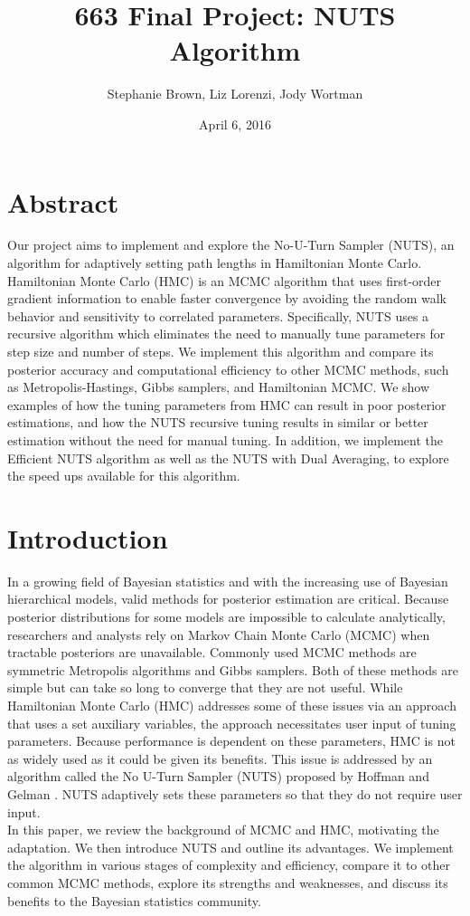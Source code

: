 \documentclass[12pt]{article}
\title{663 Final Project: NUTS Algorithm}
\author{Stephanie Brown, Liz Lorenzi, Jody Wortman}
\date{April 6, 2016}
\begin{document}
\maketitle


\section*{Abstract}
Our project aims to implement and explore the No-U-Turn Sampler (NUTS), an algorithm for adaptively setting path lengths in Hamiltonian Monte Carlo. Hamiltonian Monte Carlo (HMC) is an MCMC algorithm that uses first-order gradient information to enable faster convergence by avoiding the random walk behavior and sensitivity to correlated parameters.  Specifically, NUTS uses a recursive algorithm which eliminates the need to manually tune parameters for step size and number of steps.  We implement this algorithm and compare its posterior accuracy and computational efficiency to other MCMC methods, such as Metropolis-Hastings, Gibbs samplers, and Hamiltonian MCMC. We show examples of how the tuning parameters from HMC can result in poor posterior estimations, and how the NUTS recursive tuning results in similar or better estimation without the need for manual tuning. In addition, we implement the Efficient NUTS algorithm as well as the NUTS with Dual Averaging, to explore the speed ups available for this algorithm.


\section{Introduction}
In a growing field of Bayesian statistics and with the increasing use of Bayesian hierarchical models, valid methods for posterior estimation are critical. Because posterior distributions for some models are impossible to calculate analytically, researchers and analysts rely on Markov Chain Monte Carlo (MCMC) when tractable posteriors are unavailable. Commonly used MCMC methods are symmetric Metropolis algorithms and Gibbs samplers. Both of these methods are simple but can take so long to converge that they are not useful. While Hamiltonian Monte Carlo (HMC) addresses some of these issues via an approach that uses a set auxiliary variables, the approach necessitates user input of tuning parameters. Because performance is dependent on these parameters, HMC is not as widely used as it could be given its benefits. This issue is addressed by an algorithm called the No U-Turn Sampler (NUTS) proposed by Hoffman and Gelman \citeyear{homan2014no}. NUTS adaptively sets these parameters so that they do not require user input. \\
In this paper, we review the background of MCMC and HMC, motivating the adaptation. We then introduce NUTS and outline its advantages. We implement the algorithm in various stages of complexity and efficiency, compare it to other common MCMC methods, explore its strengths and weaknesses, and discuss its benefits to the Bayesian statistics community.
\end{document}
